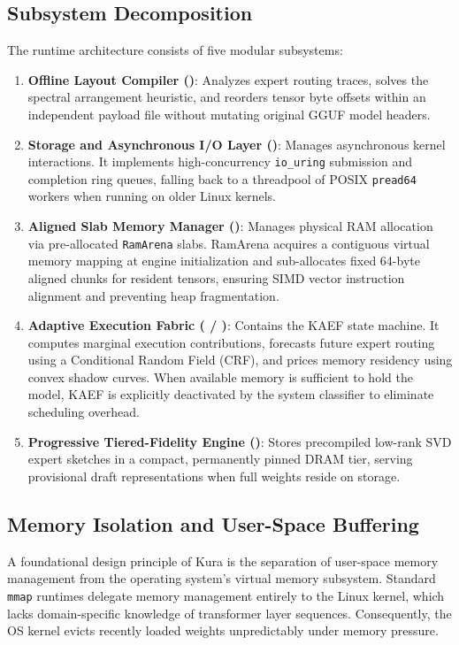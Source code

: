 \subsection{Subsystem Decomposition}
The runtime architecture consists of five modular subsystems:

\begin{enumerate}
    \item \textbf{Offline Layout Compiler ()}: Analyzes expert routing traces, solves the spectral arrangement heuristic, and reorders tensor byte offsets within an independent payload file without mutating original GGUF model headers.
    \item \textbf{Storage and Asynchronous I/O Layer ()}: Manages asynchronous kernel interactions. It implements high-concurrency \texttt{io\_uring} submission and completion ring queues, falling back to a threadpool of POSIX \texttt{pread64} workers when running on older Linux kernels.
    \item \textbf{Aligned Slab Memory Manager ()}: Manages physical RAM allocation via pre-allocated \texttt{RamArena} slabs. RamArena acquires a contiguous virtual memory mapping at engine initialization and sub-allocates fixed 64-byte aligned chunks for resident tensors, ensuring SIMD vector instruction alignment and preventing heap fragmentation.
    \item \textbf{Adaptive Execution Fabric ( / )}: Contains the KAEF state machine. It computes marginal execution contributions, forecasts future expert routing using a Conditional Random Field (CRF), and prices memory residency using convex shadow curves. When available memory is sufficient to hold the model, KAEF is explicitly deactivated by the system classifier to eliminate scheduling overhead.
    \item \textbf{Progressive Tiered-Fidelity Engine ()}: Stores precompiled low-rank SVD expert sketches in a compact, permanently pinned DRAM tier, serving provisional draft representations when full weights reside on storage.
\end{enumerate}

\subsection{Memory Isolation and User-Space Buffering}
A foundational design principle of Kura is the separation of user-space memory management from the operating system's virtual memory subsystem. Standard \texttt{mmap} runtimes delegate memory management entirely to the Linux kernel, which lacks domain-specific knowledge of transformer layer sequences. Consequently, the OS kernel evicts recently loaded weights unpredictably under memory pressure.

